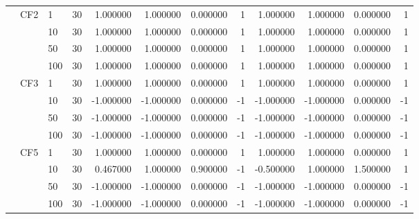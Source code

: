 \begin{tabular}{lllrrrrrrrrr}
\cline{2-12}
 & \multirow[t]{4}{*}{CF2} & 1 & 30 & 1.000000 & 1.000000 & 0.000000 & 1 & 1.000000 & 1.000000 & 0.000000 & 1 \\
 &  & 10 & 30 & 1.000000 & 1.000000 & 0.000000 & 1 & 1.000000 & 1.000000 & 0.000000 & 1 \\
 &  & 50 & 30 & 1.000000 & 1.000000 & 0.000000 & 1 & 1.000000 & 1.000000 & 0.000000 & 1 \\
 &  & 100 & 30 & 1.000000 & 1.000000 & 0.000000 & 1 & 1.000000 & 1.000000 & 0.000000 & 1 \\
\cline{2-12}
 & \multirow[t]{4}{*}{CF3} & 1 & 30 & 1.000000 & 1.000000 & 0.000000 & 1 & 1.000000 & 1.000000 & 0.000000 & 1 \\
 &  & 10 & 30 & -1.000000 & -1.000000 & 0.000000 & -1 & -1.000000 & -1.000000 & 0.000000 & -1 \\
 &  & 50 & 30 & -1.000000 & -1.000000 & 0.000000 & -1 & -1.000000 & -1.000000 & 0.000000 & -1 \\
 &  & 100 & 30 & -1.000000 & -1.000000 & 0.000000 & -1 & -1.000000 & -1.000000 & 0.000000 & -1 \\
\cline{2-12}
 & \multirow[t]{4}{*}{CF5} & 1 & 30 & 1.000000 & 1.000000 & 0.000000 & 1 & 1.000000 & 1.000000 & 0.000000 & 1 \\
 &  & 10 & 30 & 0.467000 & 1.000000 & 0.900000 & -1 & -0.500000 & 1.000000 & 1.500000 & 1 \\
 &  & 50 & 30 & -1.000000 & -1.000000 & 0.000000 & -1 & -1.000000 & -1.000000 & 0.000000 & -1 \\
 &  & 100 & 30 & -1.000000 & -1.000000 & 0.000000 & -1 & -1.000000 & -1.000000 & 0.000000 & -1 \\
\cline{1-12} \cline{2-12}
\bottomrule
\end{tabular}
